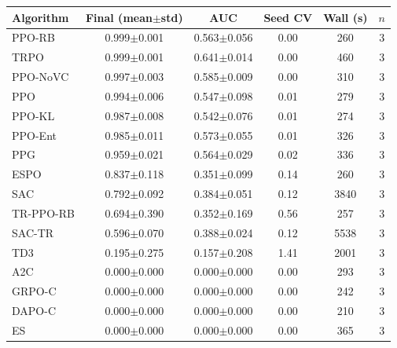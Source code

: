 \begin{tabular}{lccccc}
\toprule
Algorithm & Final (mean$\pm$std) & AUC & Seed CV & Wall (s) & $n$ \\
\midrule
PPO-RB & 0.999$\pm$0.001 & 0.563$\pm$0.056 & 0.00 & 260 & 3 \\
TRPO & 0.999$\pm$0.001 & 0.641$\pm$0.014 & 0.00 & 460 & 3 \\
PPO-NoVC & 0.997$\pm$0.003 & 0.585$\pm$0.009 & 0.00 & 310 & 3 \\
PPO & 0.994$\pm$0.006 & 0.547$\pm$0.098 & 0.01 & 279 & 3 \\
PPO-KL & 0.987$\pm$0.008 & 0.542$\pm$0.076 & 0.01 & 274 & 3 \\
PPO-Ent & 0.985$\pm$0.011 & 0.573$\pm$0.055 & 0.01 & 326 & 3 \\
PPG & 0.959$\pm$0.021 & 0.564$\pm$0.029 & 0.02 & 336 & 3 \\
ESPO & 0.837$\pm$0.118 & 0.351$\pm$0.099 & 0.14 & 260 & 3 \\
SAC & 0.792$\pm$0.092 & 0.384$\pm$0.051 & 0.12 & 3840 & 3 \\
TR-PPO-RB & 0.694$\pm$0.390 & 0.352$\pm$0.169 & 0.56 & 257 & 3 \\
SAC-TR & 0.596$\pm$0.070 & 0.388$\pm$0.024 & 0.12 & 5538 & 3 \\
TD3 & 0.195$\pm$0.275 & 0.157$\pm$0.208 & 1.41 & 2001 & 3 \\
A2C & 0.000$\pm$0.000 & 0.000$\pm$0.000 & 0.00 & 293 & 3 \\
GRPO-C & 0.000$\pm$0.000 & 0.000$\pm$0.000 & 0.00 & 242 & 3 \\
DAPO-C & 0.000$\pm$0.000 & 0.000$\pm$0.000 & 0.00 & 210 & 3 \\
ES & 0.000$\pm$0.000 & 0.000$\pm$0.000 & 0.00 & 365 & 3 \\
\bottomrule
\end{tabular}